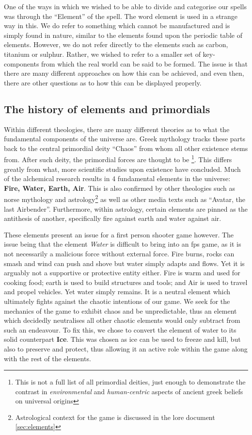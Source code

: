 \documentclass[12pt,a4paper]{report}
\begin{document}
One of the ways in which we wished to be able to divide and categorise our spells was through the ``Element'' of the spell. The word element is used in a strange way in this. We do refer to something which cannot be manufactured and is simply found in nature, similar to the elements found upon the periodic table of elements. However, we do not refer directly to the elements such as carbon, titanium or sulphur. Rather, we wished to refer to a smaller set of key-components from which the real world can be said to be formed. The issue is that there are many different approaches on how this can be achieved, and even then, there are other questions as to how this can be displayed properly.

\subsection{The history of elements and primordials}

Within different theologies, there are many different theories as to what the fundamental components of the universe are. Greek mythology tracks these parts back to the central primordial deity ``Chaos'' from whom all other existence stems from. After such deity, the primordial forces are thought to be \footnote{This is not a full list of all primordial deities, just enough to demonstrate the contrast in \textit{environmental} and \textit{human-centric} aspects of ancient greek beliefs on universal origins}. This differs greatly from what, more scientific studies upon existence have concluded. Much of the alchemical research results in 4 fundamental elements in the universe: \textbf{Fire, Water, Earth, Air}. This is also confirmed by other theologies such as norse mythology and astrology\footnote{Astrological context for the game is discussed in the lore document \ref{sec:elements}} as well as other media texts such as ``Avatar, the last Airbender''. Furthermore, within astrology, certain elements are pinned as the antithesis of another, specifically fire against earth and water against air.

These elements present an issue for a first person shooter game however. The issue being that the element \textit{Water} is difficult to bring into an \gls{fps} game, as it is not necessarily a malicious force without external force. Fire burns, rocks can smash and wind can push and shove but water simply adapts and flows. Yet it is arguably not a supportive or protective entity either. Fire is warm and used for cooking food; earth is used to build structures and tools; and Air is used to travel and propel vehicles. Yet water simply remains. It is a neutral element which ultimately fights against the chaotic intentions of our game. We seek for the mechanics of the game to exhibit chaos and be unpredictable, thus an element which decidedly neutralises all other chaotic elements would only subtract from such an endeavour. To fix this, we chose to convert the element of water to its solid counterpart \textbf{Ice}. This was chosen as ice can be used to freeze and kill, but also to preserve and protect, thus allowing it an active role within the game along with the rest of the elements.
\end{document}
